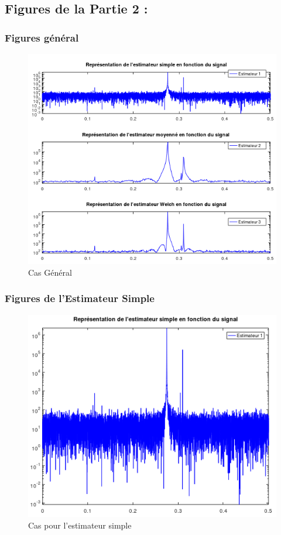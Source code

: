 \documentclass{article}
\begin{document}
\subsection{Figures de la Partie 2 : }
\subsubsection{Figures général}
\begin{figure}[h]
\centerline{\includegraphics[width=1\textwidth]{images/casgenpartie2.png}}
\caption{Cas Général}
\end{figure}
\newpage
\subsubsection{Figures de l'Estimateur Simple}
\begin{figure}[h]
\centerline{\includegraphics[width=1\textwidth]{images/casESSimpleSignalInconnue.png}}
\caption{Cas pour l'estimateur simple}
\end{figure}
\newpage
\end{document}
